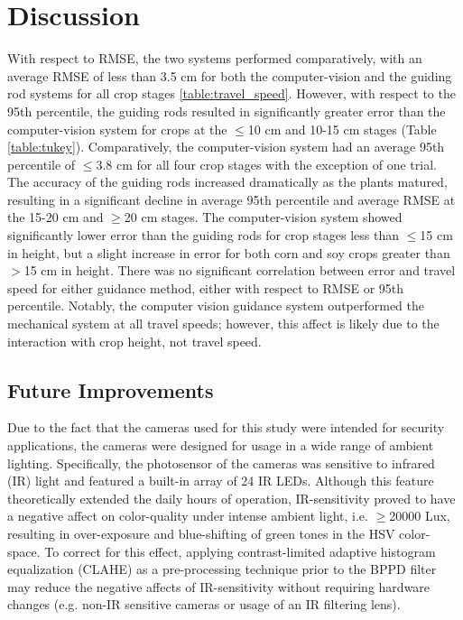 \documentclass[authoryear]{elsarticle}
\begin{document}
\section{Discussion}
With respect to RMSE, the two systems performed comparatively, with an
average RMSE of less than 3.5 cm for both the computer-vision and the
guiding rod systems for all crop stages
\ref{table:travel_speed}. However, with respect to the 95th
percentile, the guiding rods resulted in significantly greater error than the
computer-vision system for crops at the $\le$10 cm and 10-15 cm stages
(Table \ref{table:tukey}). Comparatively, the computer-vision system
had an average 95th percentile of $\le$3.8 cm for all four crop stages
with the exception of one trial. The accuracy of the guiding rods
increased dramatically as the plants matured, resulting in a
significant decline in average 95th percentile and average RMSE at the
15-20 cm and $\ge$20 cm stages. The computer-vision system showed
significantly lower error than the guiding rods for crop stages less
than $\le$15 cm in height, but a slight increase in error for both
corn and soy crops greater than $>$15 cm in height. There was no
significant correlation between error and travel speed for either guidance method,
either with respect to RMSE or 95th percentile. Notably, the computer
vision guidance system outperformed the mechanical system at all
travel speeds; however, this affect is likely due to the interaction
with crop height, not travel speed.

\subsection{Future Improvements}
Due to the fact that the cameras used for this study were intended for
security applications, the cameras were designed for usage in a wide
range of ambient lighting. Specifically, the photosensor of the
cameras was sensitive to infrared (IR) light and featured a built-in
array of 24 IR LEDs. Although this feature theoretically extended the
daily hours of operation, IR-sensitivity proved to have a negative
affect on color-quality under intense ambient light, i.e. $\ge$20000
Lux, resulting in over-exposure and blue-shifting of green tones in
the HSV color-space. To correct for this effect, applying
contrast-limited adaptive histogram equalization (CLAHE) as a
pre-processing technique prior to the BPPD filter may reduce the
negative affects of IR-sensitivity without requiring hardware changes
(e.g. non-IR sensitive cameras or usage of an IR filtering lens).
\end{document}
